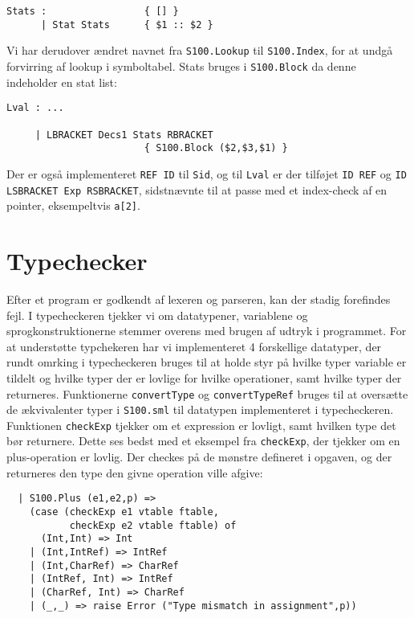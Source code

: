 \documentclass[12pt]{article}
\begin{document}
\begin{verbatim}
Stats :                 { [] }
      | Stat Stats      { $1 :: $2 }
\end{verbatim}

Vi har derudover ændret navnet fra \texttt{S100.Lookup} til \texttt{S100.Index},
for at undgå forvirring af lookup i symboltabel. Stats bruges i
    \texttt{S100.Block} da denne indeholder en stat list:\\

\begin{verbatim}
Lval : ...

     | LBRACKET Decs1 Stats RBRACKET
                        { S100.Block ($2,$3,$1) }
\end{verbatim}

Der er også implementeret \texttt{REF ID} til \texttt{Sid}, og til \texttt{Lval}
er der tilføjet \texttt{ID REF} og \texttt{ID LSBRACKET Exp RSBRACKET},
sidstnævnte til at passe med et index-check af en pointer, eksempeltvis
\texttt{a[2]}.

\section{Typechecker}
Efter et program er godkendt af lexeren og parseren, kan der stadig
forefindes fejl. I typecheckeren tjekker vi om datatypener, variablene og
sprogkonstruktionerne stemmer overens med brugen af udtryk i programmet. For at
understøtte typchekeren har vi implementeret 4 forskellige datatyper, der rundt
omrking i typecheckeren bruges til at holde styr på hvilke typer variable er
tildelt og hvilke typer der er lovlige for hvilke operationer, samt hvilke typer
der returneres. Funktionerne \texttt{convertType} og \texttt{convertTypeRef}
bruges til at oversætte de ækvivalenter typer i \texttt{S100.sml} til datatypen
implementeret i typecheckeren. \\
Funktionen \texttt{checkExp} tjekker om et expression er lovligt, samt hvilken
type det bør returnere. Dette ses bedst med et eksempel fra \texttt{checkExp},
der tjekker om en plus-operation er lovlig. Der checkes på de mønstre defineret
i opgaven, og der returneres den type den givne operation ville afgive:\\

\begin{verbatim}
  | S100.Plus (e1,e2,p) =>
    (case (checkExp e1 vtable ftable,
           checkExp e2 vtable ftable) of
      (Int,Int) => Int
    | (Int,IntRef) => IntRef
    | (Int,CharRef) => CharRef
    | (IntRef, Int) => IntRef
    | (CharRef, Int) => CharRef
    | (_,_) => raise Error ("Type mismatch in assignment",p))
\end{verbatim}
\end{document}

